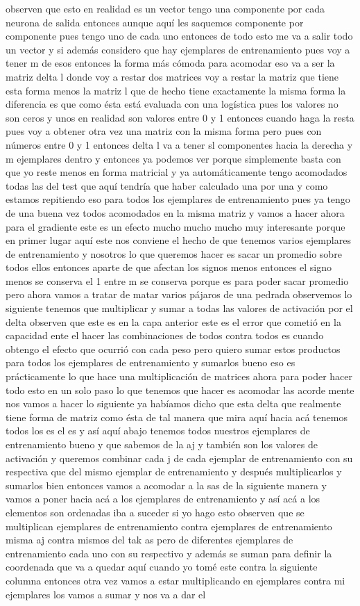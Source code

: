 observen que esto en realidad es un vector tengo una componente por cada neurona de salida entonces aunque aquí les saquemos componente por componente pues tengo uno de cada uno entonces de todo esto me va a salir todo un vector y si además considero que hay ejemplares de entrenamiento pues voy a tener m de esos entonces la forma más cómoda para acomodar eso va a ser la matriz delta l donde voy a restar dos matrices voy a restar la matriz que tiene esta forma menos la matriz l que de hecho tiene exactamente la misma forma la diferencia es que como ésta está evaluada con una logística pues los valores no son ceros y unos en realidad son valores entre 0 y 1 entonces cuando haga la resta pues voy a obtener otra vez una matriz con la misma forma pero pues con números entre 0 y 1 entonces delta l va a tener sl componentes hacia la derecha y m ejemplares dentro y entonces ya podemos ver porque simplemente basta con que yo reste menos en forma matricial y ya automáticamente tengo acomodados todas las del test que aquí tendría que haber calculado una por una y como estamos repitiendo eso para todos los ejemplares de entrenamiento pues ya tengo de una buena vez todos acomodados en la misma matriz y vamos a hacer ahora para el gradiente este es un efecto mucho mucho mucho muy interesante porque en primer lugar aquí este nos conviene el hecho de que tenemos varios ejemplares de entrenamiento y nosotros lo que queremos hacer es sacar un promedio sobre todos ellos entonces aparte de que afectan los signos menos entonces el signo menos se conserva el 1 entre m se conserva porque es para poder sacar promedio pero ahora vamos a tratar de matar varios pájaros de una pedrada observemos lo siguiente tenemos que multiplicar y sumar a todas las valores de activación por el delta observen que este es en la capa anterior este es el error que cometió en la capacidad ente el hacer las combinaciones de todos contra todos es cuando obtengo el efecto que ocurrió con cada peso pero quiero sumar estos productos para todos los ejemplares de entrenamiento y sumarlos bueno eso es prácticamente lo que hace una multiplicación de matrices ahora para poder hacer todo esto en un solo paso lo que tenemos que hacer es acomodar las acorde mente nos vamos a hacer lo siguiente ya habíamos dicho que esta delta que realmente tiene forma de matriz como ésta de tal manera que mira aquí hacia acá tenemos todos los es el es y así aquí abajo tenemos todos nuestros ejemplares de entrenamiento bueno y que sabemos de la aj y también son los valores de activación y queremos combinar cada j de cada ejemplar de entrenamiento con su respectiva que del mismo ejemplar de entrenamiento y después multiplicarlos y sumarlos bien entonces vamos a acomodar a la sas de la siguiente manera y vamos a poner hacia acá a los ejemplares de entrenamiento y así acá a los elementos son ordenadas iba a suceder si yo hago esto observen que se multiplican ejemplares de entrenamiento contra ejemplares de entrenamiento misma aj contra mismos del tak as pero de diferentes ejemplares de entrenamiento cada uno con su respectivo y además se suman para definir la coordenada que va a quedar aquí cuando yo tomé este contra la siguiente columna entonces otra vez vamos a estar multiplicando en ejemplares contra mi ejemplares los vamos a sumar y nos va a dar el 